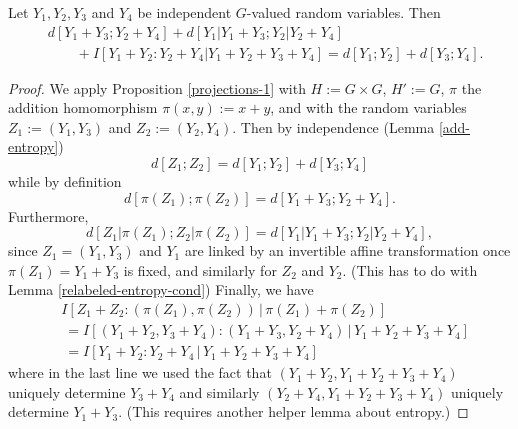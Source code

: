 \begin{corollary}\label{cor-fibre}
  Let $Y_1,Y_2,Y_3$ and $Y_4$ be independent $G$-valued random variables.
  Then
\begin{align*}
  & d[Y_1+Y_3; Y_2+Y_4] + d[Y_1|Y_1+Y_3; Y_2|Y_2+Y_4] \\
  &\qquad + I[ Y_1+Y_2 : Y_2 + Y_4 | Y_1+Y_2+Y_3+Y_4 ] = d[Y_1; Y_2] + d[ Y_3; Y_4].
\end{align*}
\end{corollary}

\begin{proof}
  We apply Proposition \ref{projections-1} with $H := G \times G$, $H' := G$, $\pi$ the addition homomorphism $\pi(x,y) := x+y$, and with the random variables $Z_1 := (Y_1,Y_3)$ and $Z_2 := (Y_2,Y_4)$.  Then by independence (Lemma \ref{add-entropy})
\[
  d[Z_1; Z_2] = d[Y_1; Y_2] + d[Y_3; Y_4]
\]
while by definition
\[
  d[\pi(Z_1); \pi(Z_2)] = d[Y_1+Y_3; Y_2+Y_4].
\]
Furthermore,
\[
  d[Z_1|\pi(Z_1); Z_2|\pi(Z_2)] = d[Y_1|Y_1+Y_3;Y_2|Y_2+Y_4],
\]
since $Z_1=(Y_1,Y_3)$ and $Y_1$ are linked by an invertible affine transformation once $\pi(Z_1)=Y_1+Y_3$ is fixed, and similarly for $Z_2$ and $Y_2$.  (This has to do with Lemma \ref{relabeled-entropy-cond})
Finally, we have
\begin{align*}
  &I[Z_1 + Z_2 : (\pi(Z_1),\pi(Z_2)) \,|\, \pi(Z_1) + \pi(Z_2)] \\
  &\ = I[(Y_1+Y_2, Y_3+Y_4) : (Y_1+Y_3, Y_2+Y_4) \,|\, Y_1+Y_2+Y_3+Y_4] \\
  &\ = I[Y_1+Y_2 : Y_2+Y_4 \,|\, Y_1+Y_2+Y_3+Y_4]
\end{align*}
where in the last line we used the fact that $(Y_1+Y_2, Y_1+Y_2+Y_3+Y_4)$ uniquely determine $Y_3+Y_4$ and similarly
$(Y_2+Y_4, Y_1+Y_2+Y_3+Y_4)$ uniquely determine $Y_1+Y_3$.  (This requires another helper lemma about entropy.)
\end{proof}
